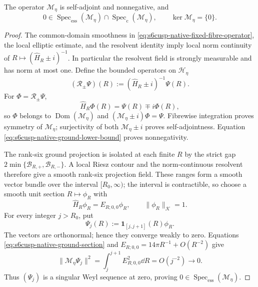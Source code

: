 \begin{theorem}
\label{thm:s6cusp-native-direct-integral-threshold}
The operator \(\mathscr M_\eta\) is self-adjoint and nonnegative, and
\begin{equation}\label{eq:s6cusp-native-direct-integral-spectrum-zero}
 0\in\operatorname{Spec}_{\mathrm{ess}}(\mathscr M_\eta)
 \cap\operatorname{Spec}_{\mathrm c}(\mathscr M_\eta),
 \qquad
 \ker\mathscr M_\eta=\{0\}.
\end{equation}
\end{theorem}

\begin{proof}
The common-domain smoothness in
\eqref{eq:s6cusp-native-fixed-fibre-operator}, the local elliptic estimate,
and the resolvent identity imply local norm continuity of
\(R\mapsto(\widehat H_R\pm i)^{-1}\).  In particular the resolvent field is
strongly measurable and has norm at most one.  Define the bounded operators
on \(\mathscr H_\eta\)
\begin{equation*}
 (\mathscr R_\pm\Psi)(R):=
 (\widehat H_R\pm i)^{-1}\Psi(R).
\end{equation*}
For \(\Phi=\mathscr R_\pm\Psi\),
\begin{equation*}
 \widehat H_R\Phi(R)=\Psi(R)\mp i\Phi(R),
\end{equation*}
so \(\Phi\) belongs to
\(\operatorname{Dom}(\mathscr M_\eta)\) and
\((\mathscr M_\eta\pm i)\Phi=\Psi\).  Fibrewise integration proves
symmetry of \(\mathscr M_\eta\); surjectivity of both
\(\mathscr M_\eta\pm i\) proves self-adjointness.  Equation
\eqref{eq:s6cusp-native-ground-lower-bound} proves nonnegativity.

The rank-six ground projection is isolated at each finite \(R\) by the
strict gap \(2\min\{\mathcal B_{R,+},\mathcal B_{R,-}\}\).  A local Riesz
contour and the norm-continuous resolvent therefore give a smooth rank-six
projection field.  These ranges form a smooth vector bundle over the
interval \([R_0,\infty)\); the interval is contractible, so choose a smooth
unit section \(R\mapsto\phi_R\) with
\begin{equation}\label{eq:s6cusp-native-ground-section}
 \widehat H_R\phi_R=E_{R;0,0}\phi_R,
 \qquad \lVert\phi_R\rVert_{\mathscr K}=1.
\end{equation}
For every integer \(j>R_0\), put
\begin{equation}\label{eq:s6cusp-native-Weyl-sequence}
 \Psi_j(R):=\mathbf1_{[j,j+1]}(R)\phi_R.
\end{equation}
The vectors are orthonormal; hence they converge weakly to zero.  Equations
\eqref{eq:s6cusp-native-ground-section} and
\(E_{R;0,0}=14\pi R^{-1}+O(R^{-2})\) give
\begin{equation}\label{eq:s6cusp-native-Weyl-residual}
 \lVert\mathscr M_\eta\Psi_j\rVert^2
 =\int_j^{j+1}E_{R;0,0}^2\dd R
 =O(j^{-2})\longrightarrow0.
\end{equation}
Thus \((\Psi_j)\) is a singular Weyl sequence at zero, proving
\(0\in\operatorname{Spec}_{\mathrm{ess}}(\mathscr M_\eta)\).


\end{proof}
